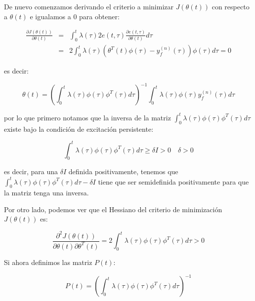             De nuevo comenzamos derivando el criterio a minimizar $J \left( \theta(t) \right)$ con respecto a $\theta(t)$ e igualamos a $0$ para obtener:

            \begin{eqnarray*}
                \frac{\partial J \left( \theta(t) \right)}{\partial \theta(t)} & = & \int_0^t \lambda(\tau) 2 e(t, \tau)\frac{\partial e(t, \tau)}{\partial \theta(t)} d\tau \\
                & = & 2 \int_0^t \lambda(\tau) \left( \theta^T(t) \phi(\tau) - y_f^{(n)}(\tau) \right) \phi(\tau) d\tau = 0
            \end{eqnarray*}

            es decir:

            \begin{equation} \label{eq:adap9}
                \theta(t) = \left( \int_0^t \lambda(\tau) \phi(\tau) \phi^T(\tau) d\tau \right)^{-1} \int_0^t \lambda(\tau) \phi(\tau) y_f^{(n)}(\tau) d\tau
            \end{equation}

            por lo que primero notamos que la inversa de la matriz $\int_0^t \lambda(\tau) \phi(\tau) \phi^T(\tau) d\tau$ existe bajo la condición de excitación persistente:

            \begin{equation}
                \int_0^t \lambda(\tau) \phi(\tau) \phi^T(\tau) d\tau \ge \delta I > 0 \quad \delta > 0
            \end{equation}

            es decir, para una $\delta I$ definida positivamente, tenemos que $\int_0^t \lambda(\tau) \phi(\tau) \phi^T(\tau) d\tau - \delta I$ tiene que ser semidefinida positivamente para que la matriz tenga una inversa.

            Por otro lado, podemos ver que el Hessiano del criterio de minimización $J \left( \theta(t) \right)$ es:

            \begin{equation}
                \frac{\partial^2 J \left( \theta(t) \right)}{\partial \theta(t) \partial \theta^T(t)} = 2 \int_0^t \lambda(\tau) \phi(\tau) \phi^T(\tau) d\tau > 0
            \end{equation}

            Si ahora definimos las matriz $P(t)$:

            \begin{equation}
                P(t) = \left( \int_0^t \lambda(\tau) \phi(\tau) \phi^T(\tau) d\tau \right) ^{-1}
            \end{equation}

